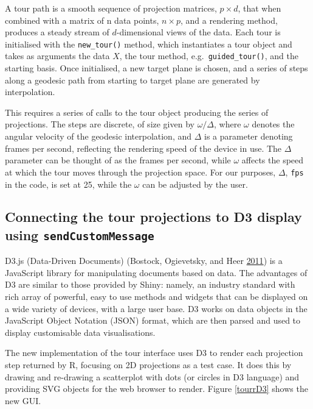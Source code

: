 A tour path is a smooth sequence of projection matrices, \(p\times d\),
that when combined with a matrix of n data points, \(n\times p\), and a
rendering method, produces a steady stream of \(d\)-dimensional views of
the data. Each tour is initialised with the \texttt{new\_tour()} method,
which instantiates a tour object and takes as arguments the data \(X\),
the tour method, e.g.~\texttt{guided\_tour()}, and the starting basis.
Once initialised, a new target plane is chosen, and a series of steps
along a geodesic path from starting to target plane are generated by
interpolation.

This requires a series of calls to the tour object producing the series
of projections. The steps are discrete, of size given by
\(\omega/\Delta\), where \(\omega\) denotes the angular velocity of the
geodesic interpolation, and \(\Delta\) is a parameter denoting frames
per second, reflecting the rendering speed of the device in use. The
\(\Delta\) parameter can be thought of as the frames per second, while
\(\omega\) affects the speed at which the tour moves through the
projection space. For our purposes, \(\Delta\), \texttt{fps} in the
code, is set at 25, while the \(\omega\) can be adjusted by the user.

\hypertarget{connecting-the-tour-projections-to-d3-display-using-sendcustommessage}{%
\subsection{\texorpdfstring{Connecting the tour projections to D3
display using
\texttt{sendCustomMessage}}{Connecting the tour projections to D3 display using sendCustomMessage}}\label{connecting-the-tour-projections-to-d3-display-using-sendcustommessage}}

D3.js (Data-Driven Documents) (Bostock, Ogievetsky, and Heer
\protect\hyperlink{ref-D3}{2011}) is a JavaScript library for
manipulating documents based on data. The advantages of D3 are similar
to those provided by Shiny: namely, an industry standard with rich array
of powerful, easy to use methods and widgets that can be displayed on a
wide variety of devices, with a large user base. D3 works on data
objects in the JavaScript Object Notation (JSON) format, which are then
parsed and used to display customisable data visualisations.

The new implementation of the tour interface uses D3 to render each
projection step returned by R, focusing on 2D projections as a test
case. It does this by drawing and re-drawing a scatterplot with dots (or
circles in D3 language) and providing SVG objects for the web browser to
render. Figure \ref{tourrD3} shows the new GUI.

